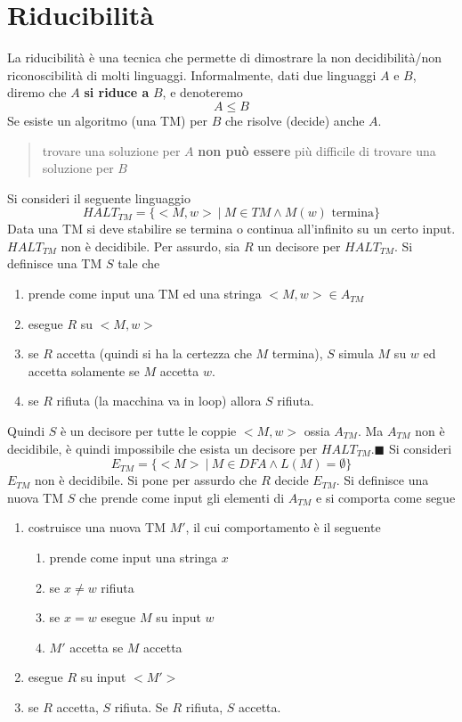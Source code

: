 \documentclass[10pt, letterpaper]{report}
\begin{document}
\section{Riducibilità}
La riducibilità è una tecnica che permette di dimostrare la non decidibilità/non riconoscibilità di molti linguaggi. Informalmente, dati due linguaggi $A$ e $B$,  diremo che $A$ \textbf{si riduce a} $B$, e denoteremo $$ A\le B$$ Se esiste un algoritmo (una TM) per $B$ che risolve (decide) anche $A$.\begin{quotation}
    trovare una soluzione per $A$ \textbf{non può essere} più difficile di trovare una soluzione per $B$
\end{quotation}
Si consideri il seguente linguaggio 
$$ HALT_{TM}=\{<M,w> \ | \ M\in TM\land M(w)\text{ termina} \}$$
Data una TM si deve stabilire se termina o continua all'infinito su un certo input.\acc 
{} $HALT_{TM}$ non è decidibile.\acc 
\dimo{} Per assurdo, sia $R$ un decisore per $HALT_{TM}$. Si definisce una TM $S$ tale che \begin{enumerate}
    \item prende come input una TM ed una stringa $<M,w>\in A_{TM}$
    \item esegue $R$ su $<M,w>$
    \item se $R$ accetta (quindi si ha la certezza che $M$ termina), $S$ simula $M$ su $w$ ed accetta solamente se $M$ accetta $w$.
    \item se $R$ rifiuta (la macchina va in loop) allora $S$ rifiuta.
\end{enumerate}
Quindi $S$ è un decisore per tutte le coppie $<M,w>$ ossia $A_{TM}$. Ma $A_{TM}$ non è decidibile, è quindi impossibile che esista un decisore per $HALT_{TM}$.\hfill$\blacksquare$\acc 
Si consideri 
$$ E_{TM}=\{<M>\ | \ M\in DFA \land L(M)=\emptyset\}$$
\prop{} $E_{TM}$ non è decidibile.\acc 
\dimo{} Si pone per assurdo che $R$ decide $E_{TM}$. Si definisce una nuova TM $S$ che prende come input gli elementi di $A_{TM}$ e si comporta come segue \begin{enumerate}
    \item costruisce una nuova TM $M'$, il cui comportamento è il seguente\begin{enumerate}
        \item prende come input una stringa $x$
        \item se $x\ne w$ rifiuta 
        \item se $x=w$ esegue $M$ su input $w$
        \item $M'$ accetta se $M$ accetta
    \end{enumerate}
    \item esegue $R$ su input $<M'>$
    \item se $R$ accetta, $S$ rifiuta. Se $R$ rifiuta, $S$ accetta.
\end{enumerate}
\end{document}
